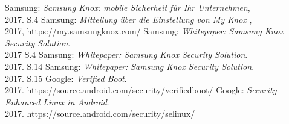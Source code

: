 \documentclass[11pt,a4paper,oneside, 
liststotoc, 					%
bibtotoc,						%
titlepage, 						%
headsepline, 					%
BCOR6mm,						%
]{scrreprt}
\begin{document}
\setcounter{secnumdepth}{3}					%
\setcounter{tocdepth}{3}
\sffamily									%



\tableofcontents							%
\printnomenclature[2.0cm]					%
\listoffigures 								%
\listoftables 								%
\pagebreak

\pagestyle{fancy}					
\rmfamily





%
%




\begin{thebibliography}{999999}

Samsung: \emph{Samsung Knox: mobile Sicherheit für Ihr Unternehmen},\\2017. S.4
Samsung: \emph{Mitteilung über die Einstellung von My Knox },\\2017, https://my.samsungknox.com/
Samsung: \emph{Whitepaper: Samsung Knox Security Solution}.\\2017 S.4
Samsung: \emph{Whitepaper: Samsung Knox Security Solution}.\\2017. S.14
Samsung: \emph{Whitepaper: Samsung Knox Security Solution}.\\2017. S.15
Google: \emph{Verified Boot}.\\2017. https://source.android.com/security/verifiedboot/
Google: \emph{Security-Enhanced Linux in Android}.\\2017. https://source.android.com/security/selinux/


\end{thebibliography}


\begin{appendix}
\clearpage
{}						%
\end{appendix}
\end{document}
